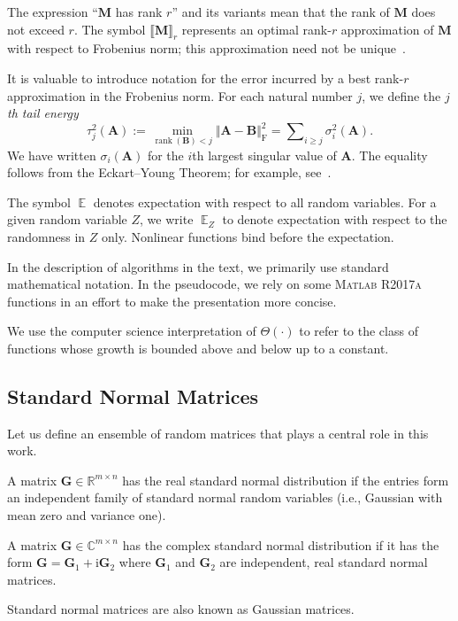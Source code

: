 \documentclass[final]{siamart1116}
\numberwithin{equation}{section}
\numberwithin{theorem}{section}
\numberwithin{figure}{section}
\newcommand{\R}{\mathbb{R}}
\newcommand{\C}{\mathbb{C}}
\newcommand{\mtx}[1]{\bm{#1}}
\newcommand{\rank}{\operatorname{rank}}
\newcommand{\norm}[1]{\Vert #1 \Vert}
\newcommand{\fnorm}[1]{\norm{#1}_{\mathrm{F}}}
\newcommand{\fnormsq}[1]{\fnorm{#1}^2}
\newcommand{\lowrank}[2]{\llbracket {#1} \rrbracket_{#2}}
\newcommand{\Expect}{\operatorname{\mathbb{E}}}
\begin{document}
The expression ``$\mtx{M}$ has rank $r$'' and its variants
mean that the rank of $\mtx{M}$ does not exceed $r$.
The symbol $\lowrank{\mtx{M}}{r}$ represents an optimal rank-$r$
approximation of $\mtx{M}$ with respect to Frobenius norm;
this approximation need not be unique~\cite[Sec.~6]{Hig89:Matrix-Nearness}.

It is valuable to introduce notation for the error incurred by a
best rank-$r$ approximation in the Frobenius norm.
For each natural number $j$, we define the \emph{$j$th tail energy}
\begin{equation} \label{eqn:tail-energy}
\tau_{j}^2(\mtx{A}) := \min_{\rank(\mtx{B}) < j} \fnormsq{ \mtx{A} - \mtx{B} }
	= \sum\nolimits_{i \geq j} \sigma_i^2(\mtx{A}).
\end{equation}
We have written $\sigma_i(\mtx{A})$ for the $i$th largest singular value of $\mtx{A}$.
The equality follows from the Eckart--Young Theorem;
for example, see~\cite[Sec.~6]{Hig89:Matrix-Nearness}.


The symbol $\Expect$ denotes expectation with respect to all random variables.
For a given random variable $Z$, we write $\Expect_{Z}$ to denote expectation
with respect to the randomness in $Z$ only.  Nonlinear functions bind before
the expectation.

In the description of algorithms in the text, we primarily use standard
mathematical notation.  In the pseudocode, we rely on some
\textsc{Matlab R2017a} functions in an effort to make the presentation
more concise.

We use the computer science interpretation of
$\Theta(\cdot)$ to refer to the class of functions
whose growth is bounded above and below up to a constant.





\subsection{Standard Normal Matrices}

Let us define an ensemble of random matrices that plays a
central role in this work.

\begin{definition} \label{def:std-normal-mtx}
A matrix $\mtx{G} \in \R^{m \times n}$ has the real standard normal distribution
if the entries form an independent family of standard normal random variables
(i.e., Gaussian with mean zero and variance one).

A matrix $\mtx{G} \in \C^{m \times n}$ has the complex standard normal distribution
if it has the form $\mtx{G} = \mtx{G}_1 + \mathrm{i} \mtx{G}_2$
where $\mtx{G}_1$ and $\mtx{G}_2$ are independent, real standard normal matrices.

Standard normal matrices are also known as Gaussian matrices.
\end{definition}
\end{document}
